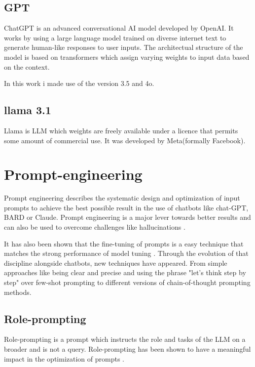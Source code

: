 \documentclass[a4paper,11pt,oneside]{memoir}
\begin{document}
\subsection{GPT}
ChatGPT is an advanced conversational AI model developed by OpenAI. It works by using a large language model trained on diverse internet text to generate human-like responses to user inputs. The architectual structure of the model is based on transformers which assign varying weights to input data based on the context.

In this work i made use of the version 3.5 and 4o.
\subsection{llama 3.1}
Llama is LLM which weights are freely available under a licence that permits some amount of commercial use. It was developed by Meta(formally Facebook).


\section{Prompt-engineering}
Prompt engineering describes the systematic design and optimization of input prompts to achieve the best possible result in the use of chatbots like chat-GPT, BARD or Claude. Prompt engineering is a major lever towards better results \cite{Citation needed} and can also be used to overcome challenges like hallucinations \cite{sato2024reducingHallucination}.

It has also been shown that the fine-tuning of prompts is a easy technique that matches the strong performance of model tuning \cite{lester2021promptsAreEfficient}.
Through the evolution of that discipline alongside chatbots, new techniques have appeared. From simple approaches like being clear and precise and using the phrase "let's think step by step" over few-shot prompting to different versions of chain-of-thought prompting methods\cite{chen2024promptengineering}. 

\subsection{Role-prompting}
Role-prompting is a prompt which instructs the role and tasks of the LLM on a broader and is not a query. Role-prompting has been shown to have a meaningful impact in the optimization of prompts \cite{kong2024promptRoleplayEffective}.
\end{document}
